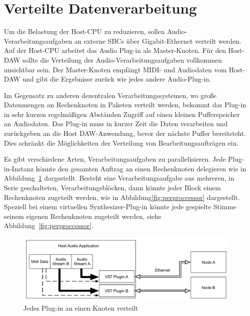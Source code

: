\section{Verteilte Datenverarbeitung}

Um die Belastung der Host-CPU zu reduzieren, sollen Audio-Verarbeitungsaufgaben an externe SBCs über Gigabit-Ethernet verteilt werden. Auf der Host-CPU arbeitet das Audio Plug-in als Master-Knoten. Für den Host-DAW sollte die Verteilung der Audio-Verarbeitungsaufgaben vollkommen unsichtbar sein. Der Master-Knoten empfängt MIDI- und Audiodaten vom Host-DAW und gibt die Ergebnisse zurück wie jedes andere Audio-Plug-in.

Im Gegensatz zu anderen dezentralen Verarbeitungssystemen, wo große Datenmengen an Rechenknoten in Paketen verteilt werden, bekommt das Plug-in in sehr kurzen regelmäßigen Abständen  Zugriff auf einen kleinen Pufferspeicher an Audiodaten. Das Plug-in muss in kurzer Zeit die Daten verarbeiten und zurückgeben an die Host DAW-Anwendung, bevor der nächste Puffer bereitsteht. Dies schränkt die Möglichkeiten  der Verteilung von Bearbeitungsaufträgen ein.

Es gibt verschiedene Arten, Verarbeitungsaufgaben zu parallelisieren. Jede Plug-in-Instanz könnte den gesamten Auftrag an einen Rechenknoten delegieren wie in Abbildung~\ref{fig:one_to_one} dargestellt. Besteht eine Verarbeitungsaufgabe aus mehreren, in Serie geschalteten, Verarbeitungsblöcken, dann könnte jeder Block einem Rechenknoten zugeteilt werden, wie in Abbildung\ref{fig:perproccessor} dargestellt. Speziell bei einem virtuellen Synthesizer-Plug-in könnte jede gespielte Stimme seinem eigenen Rechenknoten zugeteilt werden, siehe Abbildung~\ref{fig:perproccessor}.

\begin{figure}[H]
    \centering
    \includegraphics[width=\textwidth]{assets/distribution_1to1.pdf}
    \caption{Jedes Plug-in an einen Knoten verteilt}
    \label{fig:one_to_one}
\end{figure}

